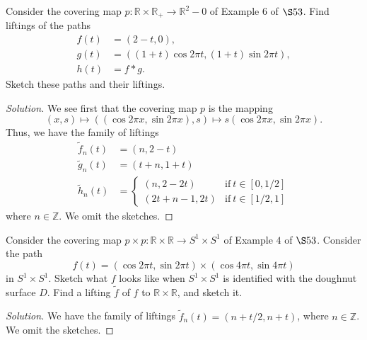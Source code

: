 \documentclass[12pt]{article}
\theoremstyle{remark}
\begin{document}
\setcounter{subsubsection}{3}
\begin{problem}
  Consider the covering map $p\colon \mathbb{R} \times \mathbb{R}_+ \to \mathbb{R}^2 - 0$ of Example $6$ of $\S53$. Find liftings of the paths
  \begin{align*}
    f(t) &= (2-t,0),\\
    g(t) &= ((1+t)\cos 2\pi t,(1+t)\sin 2\pi t),\\
    h(t) &= f * g.
  \end{align*}
  Sketch these paths and their liftings.
\end{problem}
\begin{proof}[Solution]
  We see first that the covering map $p$ is the mapping
  \begin{equation*}
    (x,s) \mapsto ((\cos 2\pi x,\sin 2\pi x),s) \mapsto s(\cos 2\pi x,\sin 2\pi x).
  \end{equation*}
  Thus, we have the family of liftings
  \begin{align*}
    \tilde{f}_n(t) &= (n,2-t)\\
    \tilde{g}_n(t) &= (t+n,1+t)\\
    \tilde{h}_n(t) &= \begin{cases}
      (n,2-2t) & \text{if}~t \in [0,1/2]\\
      (2t+n-1,2t) & \text{if}~t \in [1/2,1]
    \end{cases}
  \end{align*}
  where $n \in \mathbb{Z}$. We omit the sketches.
\end{proof}

\begin{problem}
  Consider the covering map $p \times p\colon \mathbb{R} \times \mathbb{R} \to S^1 \times S^1$ of Example $4$ of $\S53$. Consider the path
  \begin{equation*}
    f(t) = (\cos 2\pi t,\sin 2\pi t) \times (\cos 4\pi t,\sin 4\pi t)
  \end{equation*}
  in $S^1 \times S^1$. Sketch what $f$ looks like when $S^1 \times S^1$ is identified with the doughnut surface $D$. Find a lifting $\tilde{f}$ of $f$ to $\mathbb{R} \times \mathbb{R}$, and sketch it.
\end{problem}
\begin{proof}[Solution]
  We have the family of liftings $\tilde{f}_n(t) = (n+t/2,n+t)$, where $n \in
  \mathbb{Z}$. We omit the sketches.
\end{proof}

\setcounter{subsection}{57}
\end{document}
